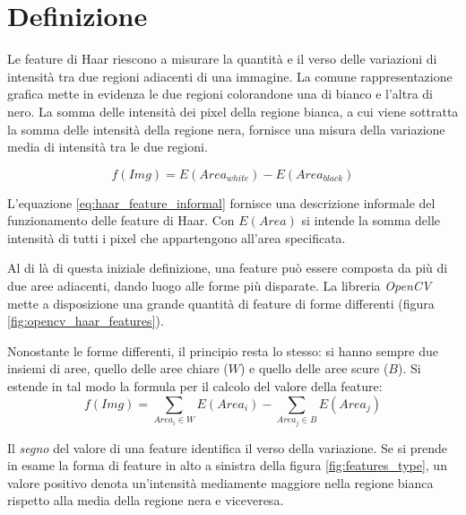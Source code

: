     \section{Definizione} %
    \label{sec:definizione}
        Le feature di Haar riescono a misurare la quantità e il verso delle variazioni di intensità tra due regioni adiacenti di una immagine.
        La comune rappresentazione grafica mette in evidenza le due regioni colorandone una di bianco e l'altra di nero.
        La somma delle intensità dei pixel della regione bianca, a cui viene sottratta la somma delle intensità della regione nera, fornisce una misura della variazione media di intensità tra le due regioni.

        \begin{equation}
            \label{eq:haar_feature_informal}
            f(Img) = E(Area_{white}) - E(Area_{black})
        \end{equation}

        L'equazione \ref{eq:haar_feature_informal} fornisce una descrizione informale del funzionamento delle feature di Haar. Con $E(Area)$ si intende la somma delle intensità di tutti i pixel che appartengono all'area specificata.

        Al di là di questa iniziale definizione, una feature può essere composta da più di due aree adiacenti, dando luogo alle forme più disparate.
        La libreria \emph{OpenCV} mette a disposizione una grande quantità di feature di forme differenti (figura \ref{fig:opencv_haar_features}).

        Nonostante le forme differenti, il principio resta lo stesso: si hanno sempre due insiemi di aree, quello delle aree chiare ($W$) e quello delle aree scure ($B$).
        Si estende in tal modo la formula per il calcolo del valore della feature:
        \begin{equation}
            \label{eq;haar_feature_general}
            f(Img) = \sum_{Area_i \in W}E(Area_i) - \sum_{Area_j \in B}E(Area_j) 
        \end{equation}

        Il \emph{segno} del valore di una feature identifica il verso della variazione. Se si prende in esame la forma di feature in alto a sinistra della figura \ref{fig:features_type}, un valore positivo denota un'intensità mediamente maggiore nella regione bianca rispetto alla media della regione nera e viceveresa.

